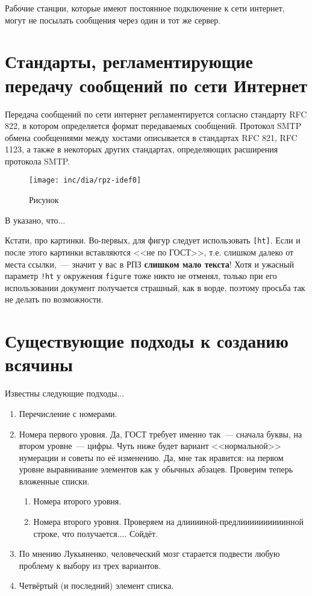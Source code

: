 Рабочие станции, которые имеют постоянное подключение к сети интернет, могут не посылать сообщения через один и тот же сервер. 


\section{Стандарты, регламентирующие передачу сообщений по сети Интернет}
Передача сообщений по сети интернет регламентируется согласно стандарту RFC 822, в котором определяется формат передаваемых сообщений. Протокол SMTP обмена сообщениями между хостами описывается в стандартах RFC 821, RFC 1123, а также в некоторых других стандартах, определяющих расширения протокола SMTP.




\begin{figure}
  \centering
  \texttt{[image: inc/dia/rpz-idef0]}
  \caption{Рисунок}
  \label{fig:fig01}
\end{figure}

В \cite{Pup09} указано, что...

Кстати, про картинки. Во-первых, для фигур следует использовать \texttt{[ht]}. Если и после этого картинки вставляются <<не по ГОСТ>>, т.е. слишком далеко от места ссылки,~--- значит у вас в РПЗ \textbf{слишком мало текста}! Хотя и ужасный параметр \texttt{!ht} у окружения \texttt{figure} тоже никто не отменял, только при его использовании документ получается страшный, как в ворде, поэтому просьба так не делать по возможности.

\section{Существующие подходы к созданию всячины}

Известны следующие подходы...

\begin{enumerate}
\item Перечисление с номерами.
\item Номера первого уровня. Да, ГОСТ требует именно так~--- сначала буквы, на втором уровне~--- цифры.
Чуть ниже будет вариант <<нормальной>> нумерации и советы по её изменению.
Да, мне так нравится: на первом уровне выравнивание элементов как у обычных абзацев. Проверим теперь вложенные списки.
\begin{enumerate}
\item Номера второго уровня.
\item Номера второго уровня. Проверяем на длииииной-предлиииииииииинной строке, что получается.... Сойдёт.
\end{enumerate}
\item По мнению Лукьяненко, человеческий мозг старается подвести любую проблему к выбору
  из трех вариантов.
\item Четвёртый (и последний) элемент списка.
\end{enumerate}

